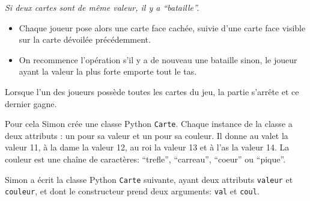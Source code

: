\documentclass[
  letterpaper,
  DIV=11,
  numbers=noendperiod]{scrartcl}
\providecommand{\tightlist}{%
  \setlength{\itemsep}{0pt}\setlength{\parskip}{0pt}}\usepackage{longtable,booktabs,array}
\begin{document}
\emph{Si deux cartes sont de même valeur, il y a ``bataille''.}

\begin{itemize}
\tightlist
\item
  Chaque joueur pose alors une carte face cachée, suivie d'une carte
  face visible sur la carte dévoilée précédemment.
\item
  On recommence l'opération s'il y a de nouveau une bataille sinon, le
  joueur ayant la valeur la plus forte emporte tout le tas.
\end{itemize}

Lorsque l'un des joueurs possède toutes les cartes du jeu, la partie
s'arrête et ce dernier gagne.

Pour cela Simon crée une classe Python \texttt{Carte}. Chaque instance
de la classe a deux attributs : un pour sa valeur et un pour sa couleur.
Il donne au valet la valeur 11, à la dame la valeur 12, au roi la valeur
13 et à l'as la valeur 14. La couleur est une chaîne de caractères:
``trefle'', ``carreau'', ``coeur'' ou ``pique''.

Simon a écrit la classe Python \texttt{Carte} suivante, ayant deux
attributs \texttt{valeur} et \texttt{couleur}, et dont le constructeur
prend deux arguments: \texttt{val} et \texttt{coul}.
\end{document}
